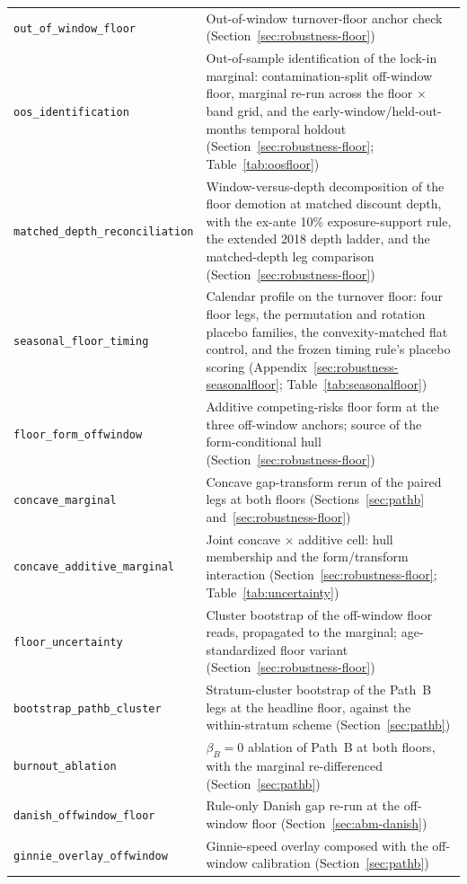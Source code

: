 \documentclass[12pt]{article}
\begin{document}
\begin{table}[H]
\begin{threeparttable}
\begin{tabular}{@{}p{5.4cm}p{8.8cm}@{}}
\texttt{out\_of\_window\_floor} & Out-of-window turnover-floor anchor check (Section~\ref{sec:robustness-floor}) \\
\texttt{oos\_identification} & Out-of-sample identification of the lock-in marginal: contamination-split off-window floor, marginal re-run across the floor $\times$ band grid, and the early-window/held-out-months temporal holdout (Section~\ref{sec:robustness-floor}; Table~\ref{tab:oosfloor}) \\
\texttt{matched\_depth\_reconciliation} & Window-versus-depth decomposition of the floor demotion at matched discount depth, with the ex-ante 10\% exposure-support rule, the extended 2018 depth ladder, and the matched-depth leg comparison (Section~\ref{sec:robustness-floor}) \\
\texttt{seasonal\_floor\_timing} & Calendar profile on the turnover floor: four floor legs, the permutation and rotation placebo families, the convexity-matched flat control, and the frozen timing rule's placebo scoring (Appendix~\ref{sec:robustness-seasonalfloor}; Table~\ref{tab:seasonalfloor}) \\
\texttt{floor\_form\_offwindow} & Additive competing-risks floor form at the three off-window anchors; source of the form-conditional hull (Section~\ref{sec:robustness-floor}) \\
\texttt{concave\_marginal} & Concave gap-transform rerun of the paired legs at both floors (Sections~\ref{sec:pathb} and~\ref{sec:robustness-floor}) \\
\texttt{concave\_additive\_marginal} & Joint concave $\times$ additive cell: hull membership and the form/transform interaction (Section~\ref{sec:robustness-floor}; Table~\ref{tab:uncertainty}) \\
\texttt{floor\_uncertainty} & Cluster bootstrap of the off-window floor reads, propagated to the marginal; age-standardized floor variant (Section~\ref{sec:robustness-floor}) \\
\texttt{bootstrap\_pathb\_cluster} & Stratum-cluster bootstrap of the Path~B legs at the headline floor, against the within-stratum scheme (Section~\ref{sec:pathb}) \\
\texttt{burnout\_ablation} & $\beta_B = 0$ ablation of Path~B at both floors, with the marginal re-differenced (Section~\ref{sec:pathb}) \\
\texttt{danish\_offwindow\_floor} & Rule-only Danish gap re-run at the off-window floor (Section~\ref{sec:abm-danish}) \\
\texttt{ginnie\_overlay\_offwindow} & Ginnie-speed overlay composed with the off-window calibration (Section~\ref{sec:pathb}) \\

\end{tabular}
\end{threeparttable}
\end{table}
\end{document}
